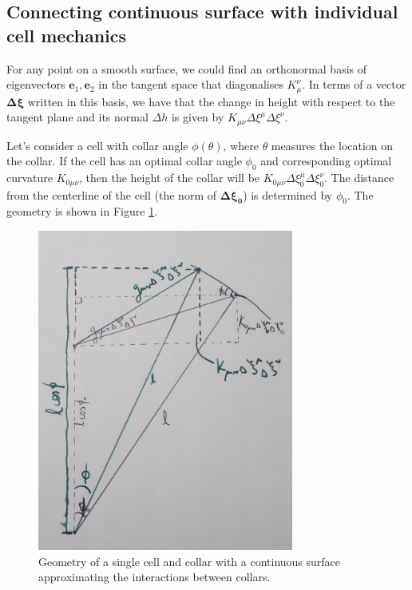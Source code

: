\subsection{Connecting continuous surface with individual cell mechanics}

For any point on a smooth surface, we could find an orthonormal basis of eigenvectors $\bm{e}_1, \bm{e}_2$ in the tangent space that diagonalises $K_\mu^\nu$. In terms of a vector $\bm{\Delta \xi}$ written in this basis, we have that the change in height with respect to the tangent plane and its normal $\Delta h$ is given by $K_{\mu\nu}\Delta\xi^\mu\Delta\xi^\nu$.

Let's consider a cell with collar angle $\phi(\theta)$, where $\theta$ measures the location on the collar. If the cell has an optimal collar angle $\phi_0$ and corresponding optimal curvature $K_{0\mu\nu}$, then the height of the collar will be $K_{0\mu\nu}\Delta\xi_0^\mu\Delta\xi_0^\nu$. The distance from the centerline of the cell (the norm of $\bm{\Delta\xi_0}$) is determined by $\phi_0$. The geometry is shown in Figure \ref{fig:geom}.

\begin{figure}[htbp]
    \centering
    \includegraphics[width=0.75\textwidth]{geom.jpg}
    \caption{Geometry of a single cell and collar with a continuous surface approximating the interactions between collars.}
    \label{fig:geom}
\end{figure}

